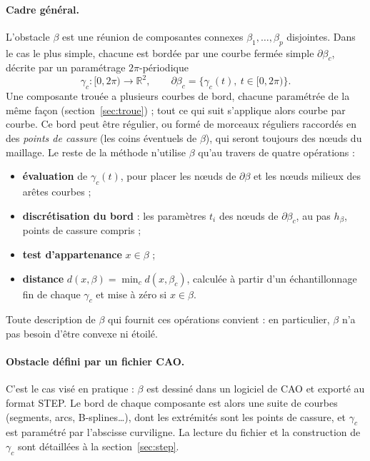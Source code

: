 \documentclass[11pt,a4paper]{article}
\begin{document}
\paragraph{Cadre général.} L'obstacle $\beta$ est une réunion de composantes
connexes $\beta_1, \dots, \beta_p$ disjointes. Dans le cas le plus simple,
chacune est bordée par une courbe
fermée simple $\partial\beta_c$, décrite par un paramétrage $2\pi$-périodique
\[
\gamma_c : [0, 2\pi) \to \mathbb{R}^2 ,
\qquad
\partial\beta_c = \{ \gamma_c(t),\ t \in [0, 2\pi) \}.
\]
Une composante trouée a plusieurs courbes de bord, chacune paramétrée de la
même façon (section~\ref{sec:troue}) ; tout ce qui suit s'applique alors
courbe par courbe. Ce bord peut être régulier, ou formé de morceaux réguliers raccordés en des
\emph{points de cassure} (les coins éventuels de $\beta$), qui seront
toujours des nœuds du maillage. Le reste de la méthode n'utilise $\beta$
qu'au travers de quatre opérations :
\begin{itemize}
  \item \textbf{évaluation} de $\gamma_c(t)$, pour placer les nœuds de
        $\partial\beta$ et les nœuds milieux des arêtes courbes ;
  \item \textbf{discrétisation du bord} : les paramètres $t_i$ des nœuds de
        $\partial\beta_c$, au pas $h_\beta$, points de cassure compris ;
  \item \textbf{test d'appartenance} $x \in \beta$ ;
  \item \textbf{distance} $d(x, \beta) = \min_c d(x, \beta_c)$, calculée à
        partir d'un échantillonnage fin de chaque $\gamma_c$ et mise à zéro
        si $x \in \beta$.
\end{itemize}
Toute description de $\beta$ qui fournit ces opérations convient : en
particulier, $\beta$ n'a pas besoin d'être convexe ni étoilé.

\paragraph{Obstacle défini par un fichier CAO.} C'est le cas visé en
pratique : $\beta$ est dessiné dans un logiciel de CAO et exporté au format
STEP. Le bord de chaque composante est alors une suite de courbes (segments,
arcs, B-splines\dots), dont les extrémités sont les points de cassure, et
$\gamma_c$ est paramétré par l'abscisse curviligne. La lecture du fichier et
la construction de $\gamma_c$ sont détaillées à la
section~\ref{sec:step}.
\end{document}
